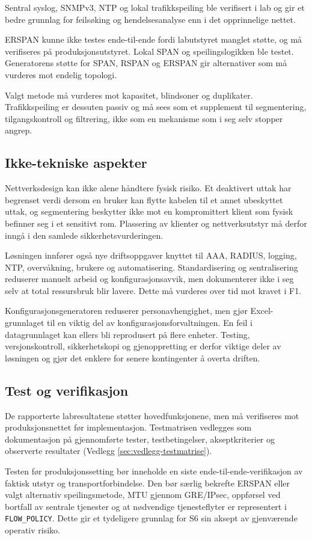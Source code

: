 Sentral syslog, SNMPv3, NTP og lokal trafikkspeiling ble verifisert i lab og gir et bedre grunnlag for feilsøking og hendelsesanalyse enn i det opprinnelige nettet.

ERSPAN kunne ikke testes ende-til-ende fordi labutstyret manglet støtte, og må verifiseres på produksjonsutstyret. Lokal SPAN og speilingslogikken ble testet. Generatorens støtte for SPAN, RSPAN og ERSPAN gir alternativer som må vurderes mot endelig topologi.

Valgt metode må vurderes mot kapasitet, blindsoner og duplikater. Trafikkspeiling er dessuten passiv og må sees som et supplement til segmentering, tilgangskontroll og filtrering, ikke som en mekanisme som i seg selv stopper angrep.

\subsection{Ikke-tekniske aspekter}

Nettverksdesign kan ikke alene håndtere fysisk risiko. Et deaktivert uttak har begrenset verdi dersom en bruker kan flytte kabelen til et annet ubeskyttet uttak, og segmentering beskytter ikke mot en kompromittert klient som fysisk befinner seg i et sensitivt rom. Plassering av klienter og nettverksutstyr må derfor inngå i den samlede sikkerhetsvurderingen.

Løsningen innfører også nye driftsoppgaver knyttet til AAA, RADIUS, logging, NTP, overvåkning, brukere og automatisering. Standardisering og sentralisering reduserer manuelt arbeid og konfigurasjonsavvik, men dokumenterer ikke i seg selv at total ressursbruk blir lavere. Dette må vurderes over tid mot kravet i F1.

Konfigurasjonsgeneratoren reduserer personavhengighet, men gjør Excel-grunnlaget til en viktig del av konfigurasjonsforvaltningen. En feil i datagrunnlaget kan ellers bli reprodusert på flere enheter. Testing, versjonskontroll, sikkerhetskopi og gjenoppretting er derfor viktige deler av løsningen og gjør det enklere for senere kontingenter å overta driften.

\subsection{Test og verifikasjon}

De rapporterte labresultatene støtter hovedfunksjonene, men må verifiseres mot produksjonsnettet før implementasjon. Testmatrisen vedlegges som dokumentasjon på gjennomførte tester, testbetingelser, akseptkriterier og observerte resultater (Vedlegg \ref{sec:vedlegg-testmatrise}).

Testen før produksjonssetting bør inneholde en siste ende-til-ende-verifikasjon av faktisk utstyr og transportforbindelse. Den bør særlig bekrefte ERSPAN eller valgt alternativ speilingsmetode, MTU gjennom GRE/IPsec, oppførsel ved bortfall av sentrale tjenester og at nødvendige tjenesteflyter er representert i \texttt{FLOW\_POLICY}. Dette gir et tydeligere grunnlag for S6 sin aksept av gjenværende operativ risiko.
